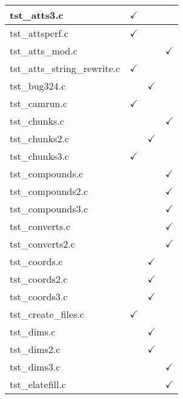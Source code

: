 \begin{table}[H]
\begin{tabular}{|l|c|c|c|}
tst\_atts3.c            & $\checkmark$  &               &               \\ \hline
tst\_attsperf.c         & $\checkmark$  &               &               \\ \hline
tst\_atts\_mod.c        &               &               & $\checkmark$  \\ \hline
tst\_atts\_string\_rewrite.c & $\checkmark$ &           &               \\ \hline
tst\_bug324.c           &               & $\checkmark$  &               \\ \hline
tst\_camrun.c           & $\checkmark$  &               &               \\ \hline
tst\_chunks.c           &               &               & $\checkmark$  \\ \hline
tst\_chunks2.c          &               & $\checkmark$  &               \\ \hline
tst\_chunks3.c          & $\checkmark$  &               &               \\ \hline
tst\_compounds.c        &               &               & $\checkmark$  \\ \hline
tst\_compounds2.c       &               &               & $\checkmark$  \\ \hline
tst\_compounds3.c       &               &               & $\checkmark$  \\ \hline
tst\_converts.c         &               &               & $\checkmark$  \\ \hline
tst\_converts2.c        &               &               & $\checkmark$  \\ \hline
tst\_coords.c           &               & $\checkmark$  &               \\ \hline
tst\_coords2.c          &               & $\checkmark$  &               \\ \hline
tst\_coords3.c          &               & $\checkmark$  &               \\ \hline
tst\_create\_files.c    & $\checkmark$  &               &               \\ \hline
tst\_dims.c             &               & $\checkmark$  &               \\ \hline
tst\_dims2.c            &               & $\checkmark$  &               \\ \hline
tst\_dims3.c            &               &               & $\checkmark$  \\ \hline
tst\_elatefill.c        &               &               & $\checkmark$  \\ \hline

\end{tabular}
\end{table}
